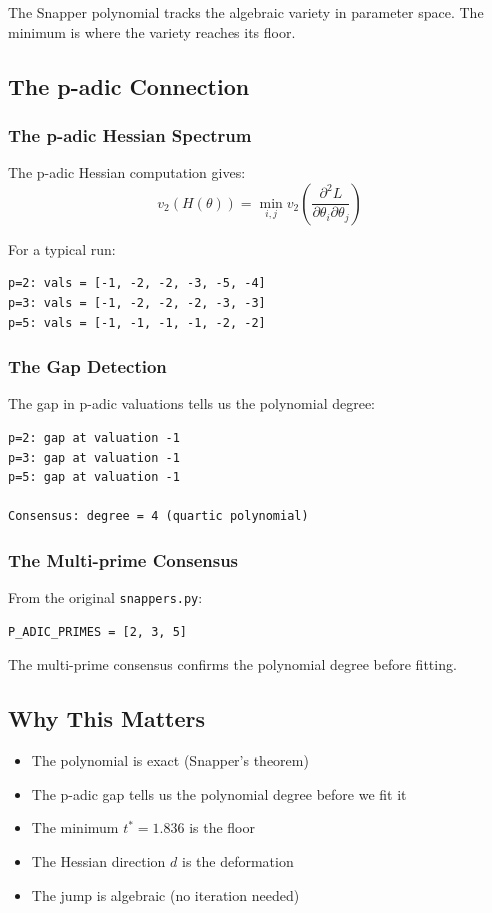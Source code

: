 \documentclass[11pt]{amsart}
\begin{document}
The Snapper polynomial tracks the algebraic variety in parameter space. The minimum is where the variety reaches its floor.

\subsection{The p-adic Connection}

\subsubsection{The p-adic Hessian Spectrum}

The p-adic Hessian computation gives:
\[
v_2(H(\theta)) = \min_{i,j} v_2\left(\frac{\partial^2 L}{\partial \theta_i \partial \theta_j}\right)
\]

For a typical run:
\begin{verbatim}
p=2: vals = [-1, -2, -2, -3, -5, -4]
p=3: vals = [-1, -2, -2, -2, -3, -3]
p=5: vals = [-1, -1, -1, -1, -2, -2]
\end{verbatim}

\subsubsection{The Gap Detection}

The gap in p-adic valuations tells us the polynomial degree:
\begin{verbatim}
p=2: gap at valuation -1
p=3: gap at valuation -1
p=5: gap at valuation -1

Consensus: degree = 4 (quartic polynomial)
\end{verbatim}

\subsubsection{The Multi-prime Consensus}

From the original \texttt{snappers.py}:
\begin{verbatim}
P_ADIC_PRIMES = [2, 3, 5]
\end{verbatim}

The multi-prime consensus confirms the polynomial degree before fitting.

\subsection{Why This Matters}

\begin{itemize}
    \item The polynomial is exact (Snapper's theorem)
    \item The p-adic gap tells us the polynomial degree before we fit it
    \item The minimum $t^* = 1.836$ is the floor
    \item The Hessian direction $d$ is the deformation
    \item The jump is algebraic (no iteration needed)
\end{itemize}
\end{document}
